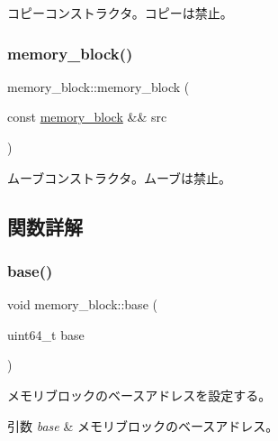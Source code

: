 コピーコンストラクタ。コピーは禁止。 \hypertarget{classmemory__block_aeae2474076d174f3ea9279c180e8252c}{}\label{classmemory__block_aeae2474076d174f3ea9279c180e8252c} 
\subsubsection{\texorpdfstring{memory\+\_\+block()}{memory\_block()}\hspace{0.1cm}{\footnotesize\ttfamily [4/4]}}
{\footnotesize\ttfamily memory\+\_\+block\+::memory\+\_\+block (\begin{DoxyParamCaption}\item[{const \hyperlink{classmemory__block}{memory\+\_\+block} \&\&}]{src }\end{DoxyParamCaption})\hspace{0.3cm}{\ttfamily [delete]}}

ムーブコンストラクタ。ムーブは禁止。 

\subsection{関数詳解}
\hypertarget{classmemory__block_a739d675f86d7e2a9f0082b2e6e4d827f}{}\label{classmemory__block_a739d675f86d7e2a9f0082b2e6e4d827f} 
\subsubsection{\texorpdfstring{base()}{base()}\hspace{0.1cm}{\footnotesize\ttfamily [1/2]}}
{\footnotesize\ttfamily void memory\+\_\+block\+::base (\begin{DoxyParamCaption}\item[{uint64\+\_\+t}]{base }\end{DoxyParamCaption})}

メモリブロックのベースアドレスを設定する。 
\begin{DoxyParams}{引数}
{\em base} & メモリブロックのベースアドレス。 \\
\hline
\end{DoxyParams}
\hypertarget{classmemory__block_a4f2105c2b57c74998ad60cd973fb6a2d}{}\label{classmemory__block_a4f2105c2b57c74998ad60cd973fb6a2d} 
